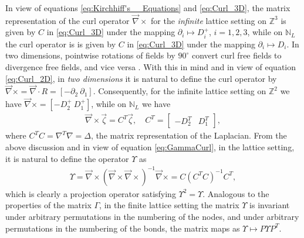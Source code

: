 \documentclass{cmslatex}
\begin{document}
In view of equations \eqref{eq:Kirchhiff's__Equations} and
\eqref{eq:Curl_3D}, the matrix representation of the curl operator
$\vec{\nabla}\times$ for the \emph{infinite} lattice setting on $\mathbb{Z}^3$
is given by $C$ in \eqref{eq:Curl_3D} under the mapping $\partial_i\mapsto D^+_i$,
$i=1,2,3$, while on $\mathbb{N}_L$ the curl operator is is given by
$C$ in \eqref{eq:Curl_3D} under the mapping $\partial_i\mapsto D_i$. In two
dimensions, pointwise rotations of fields by $90^\circ$ convert curl free
fields to divergence free fields, and vice versa
\cite{MILTON:2002:TC}. With this in mind and in view of equation
\eqref{eq:Curl_2D}, in \emph{two dimensions} it is natural to define
the curl operator by $\vec{\nabla}\times=\vec{\nabla}\cdot R=[ - \partial_2 \
\partial_1]$. Consequently, for the infinite lattice setting on
$\mathbb{Z}^2$ we have $\vec{\nabla}\times=[ - D^+_2 \ D^+_1]$, while on
$\mathbb{N}_L$ we have  
%
\begin{align}
  \vec{\nabla}\times\vec{\zeta}=C^T\vec{\zeta}, \quad
  C^T=
  \left[
    \begin{array}{ccc}
       -D_2^T  &   D_1^T
    \end{array}
  \right],
\end{align}
%
where $C^TC=\nabla^T\nabla=\Delta$, the matrix representation of the Laplacian. From
the above discussion and in view of equation \eqref{eq:GammaCurl}, in
the lattice setting, it is natural to define the operator $\Upsilon$ as
%
\begin{align}\label{eq:GammaCurl_NL}
  \Upsilon=\vec{\nabla}\times(\vec{\nabla}\times\vec{\nabla}\times)^{-1}\vec{\nabla}\times
   =C(C^TC)^{-1}C^T,
\end{align}
%
which is clearly a projection operator satisfying $\Upsilon^2=\Upsilon$. Analogous
to the properties of the matrix $\Gamma$, in the finite lattice setting the 
matrix $\Upsilon$ is invariant under arbitrary permutations in the numbering
of the nodes, and under arbitrary permutations in the numbering of the
bonds, the matrix maps as $\Upsilon\mapsto P\Upsilon P^T$.  
\end{document}
